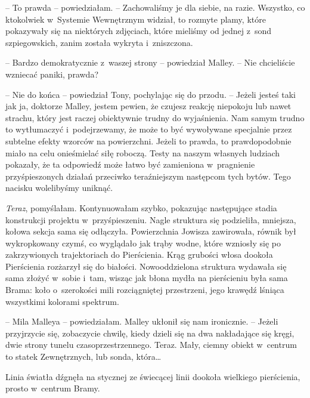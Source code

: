 \documentclass[oneside,polish,11pt,sfheadings]{mwbk}
\begin{document}
-- To prawda -- powiedziałam. -- Zachowaliśmy je dla siebie, na razie.
Wszystko, co ktokolwiek w~Systemie Wewnętrznym widział, to rozmyte
plamy, które pokazywały się na niektórych zdjęciach, które mieliśmy od
jednej z~sond szpiegowskich, zanim została wykryta i~zniszczona.

-- Bardzo demokratycznie z~waszej strony -- powiedział Malley. -- Nie
chcieliście wzniecać paniki, prawda?

-- Nie do końca -- powiedział Tony, pochylając się do przodu. -- Jeżeli
jesteś taki jak ja, doktorze Malley, jestem pewien, że czujesz reakcję
niepokoju lub nawet strachu, który jest raczej obiektywnie trudny do
wyjaśnienia. Nam samym trudno to wytłumaczyć i~podejrzewamy, że może to
być wywoływane specjalnie przez subtelne efekty wzorców na powierzchni.
Jeżeli to prawda, to prawdopodobnie miało na celu onieśmielać siłę
roboczą. Testy na naszym własnych ludziach pokazały, że ta odpowiedź
może łatwo być zamieniona w~pragnienie przyśpieszonych działań przeciwko
teraźniejszym następcom tych bytów. Tego nacisku wolelibyśmy uniknąć.

\textit{Teraz}, pomyślałam. Kontynuowałam szybko, pokazując następujące
stadia konstrukcji projektu w~przyśpieszeniu. Nagle struktura się
podzieliła, mniejsza, kołowa sekcja sama się odłączyła. Powierzchnia
Jowisza zawirowała, równik był wykropkowany czymś, co wyglądało jak
trąby wodne, które wzniosły się po zakrzywionych trajektoriach do
Pierścienia. Krąg grubości włosa dookoła Pierścienia rozżarzył się do
białości. Nowooddzielona struktura wydawała się sama złożyć w~sobie i~tam, wisząc jak błona mydła na pierścieniu była sama Brama: koło o~szerokości mili rozciągniętej przestrzeni, jego krawędź lśniąca
wszystkimi kolorami spektrum.

-- Mila Malleya -- powiedziałam. Malley ukłonił się nam ironicznie. -- Jeżeli przyjrzycie się, zobaczycie chwilę, kiedy dzieli się na dwa
nakładające się kręgi, dwie strony tunelu czasoprzestrzennego. Teraz.
Mały, ciemny obiekt w~centrum to statek Zewnętrznych, lub sonda,
która\ldots 

Linia światła dźgnęła na stycznej ze świecącej linii dookoła wielkiego
pierścienia, prosto w~centrum Bramy.
\end{document}
